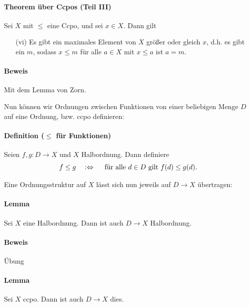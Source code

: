 \documentclass[a4paper,11pt,abstracton]{scrartcl}
\begin{document}
\paragraph{Theorem über Ccpos (Teil III)} Sei $X$ mit $\leq$ eine Ccpo, und sei $x \in X$. Dann gilt
\begin{enumerate}
 \item[(vi)] Es gibt ein maximales Element von $X$ größer oder gleich $x$, d.h. es gibt ein $m$, sodass $x \leq m$ für alle $a \in X$ mit $x \leq a$ ist $a = m$.
\end{enumerate}
\paragraph{Beweis} Mit dem Lemma von Zorn.

Nun können wir Ordnungen zwischen Funktionen von einer beliebigen Menge $D$ auf eine Ordnung, bzw. ccpo definieren:
\paragraph{Definition ($\leq$ für Funktionen)} Seien $f,g\colon D \to X$ und $X$ Halbordnung. Dann definiere
\begin{equation}
 f \leq g \quad :\Leftrightarrow \quad \textnormal{ für alle } d \in D \textnormal{ gilt } f(d) \leq g(d).
\end{equation}

Eine Ordnungsstruktur auf $X$ lässt sich nun jeweils auf $D \to X$ übertragen:
\paragraph{Lemma} Sei $X$ eine Halbordnung. Dann ist auch $D \to X$ Halbordnung.
\paragraph{Beweis} Übung
\paragraph{Lemma} Sei $X$ ccpo. Dann ist auch $D \to X$ dies.
\end{document}

